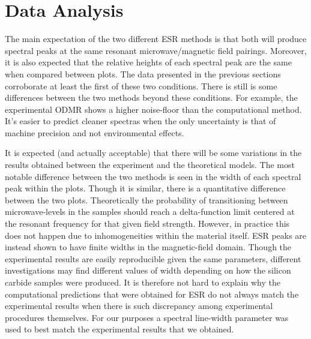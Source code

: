 \documentclass[oneside]{BYUPhys}
\begin{document}
\section{Data Analysis}

The main expectation of the two different ESR methods is that both will produce spectral peaks at the same resonant microwave/magnetic field pairings. Moreover, it is also expected that the relative heights of each spectral peak are the same when compared between plots. The data presented in the previous sections corroborate at least the first of these two conditions. There is still is some differences between the two methods beyond these conditions. For example, the experimental ODMR shows a higher noise-floor than the computational method. It's easier to predict cleaner spectras when the only uncertainty is that of machine precision and not environmental effects.

It is expected (and actually acceptable) that there will be some variations in the results obtained between the experiment and the theoretical models. The most notable difference between the two methods is seen in the width of each spectral peak within the plots. Though it is similar, there is a quantitative difference between the two plots. Theoretically the probability of transitioning between microwave-levels in the samples should reach a delta-function limit centered at the resonant frequency for that given field strength. However, in practice this does not happen due to inhomogeneities within the material itself. ESR peaks are instead shown to have finite widths in the magnetic-field domain. Though the experimental results are easily reproducible given the same parameters, different investigations may find different values of width depending on how the silicon carbide samples were produced. It is therefore not hard to explain why the computational predictions that were obtained for ESR do not always match the experimental results when there is such discrepancy among experimental procedures themselves. For our purposes a spectral line-width parameter was used to best match the experimental results that we obtained.
\end{document}
